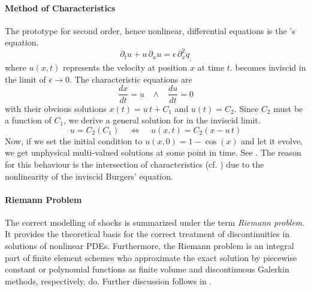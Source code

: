 \paragraph{Method of Characteristics}
The prototype for second order, hence nonlinear, differential equations is the
's equation.
\begin{equation}
\label{eqn:burger}
    \partial_t u + u \, \partial_x u = \epsilon \, \partial^2_x q_,
\end{equation}
where $u(x,t)$ represents the velocity at position $x$ at time $t$. 
becomes inviscid in the limit of $\epsilon \to 0$. The characteristic equations
are
\begin{equation}
\label{eqn:burger-characteristics}
    \frac{dx}{dt} = u \;\;\;\wedge\;\;\; \frac{du}{dt} = 0
\end{equation}
with their obvious solutions $x(t) = u\,t + C_1$ and $u(t) = C_2$. Since $C_2$
must be a function of $C_1$, we derive a general solution for  in
the inviscid limit.
\begin{equation}
\label{eqn:burger-general-solution}
    u = C_2(C_1) \;\;\;\; \Longleftrightarrow \;\;\;\; u(x,t) = C_2(x - u\,t)
\end{equation}
Now, if we set the initial condition to $u(x,0) = 1 - \cos(x)$ and let it
evolve, we get unphysical multi-valued solutions at some point in time. See
. The reason for this behaviour is the
intersection of characteristics (cf. ) due
to the nonlinearity of the inviscid Burgers' equation.
\paragraph{Riemann Problem}
The correct modelling of shocks is summarized under the term \emph{Riemann
problem}. It provides the theoretical basis for the correct treatment of
discontinuities in solutions of nonlinear PDEs. Furthermore, the Riemann
problem is an integral part of finite element schemes who approximate the
exact solution by piecewise constant or polynomial functions as
finite volume and discontinuous Galerkin methods, respectively, do. Further
discussion follows in .

